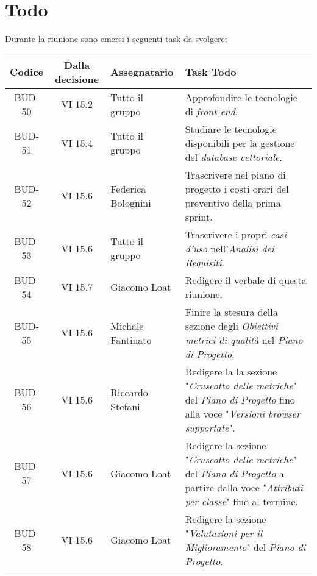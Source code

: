 
\section{Todo}

Durante la riunione sono emersi i seguenti task da svolgere:

\vspace{0.5cm}

\begin{table}[htbp]
\centering
{}
\begin{tabular}{|c|c|p{}|p{}|}
    \hline
    \rowcolor[gray]{0.75}
    \textbf{Codice} & \textbf{Dalla decisione} & \textbf{Assegnatario} & \textbf{Task Todo} \\
    \hline
    BUD-50 & VI 15.2 & Tutto il gruppo & Approfondire le tecnologie di \emph{front-end}. \\
    \hline
    BUD-51 & VI 15.4 & Tutto il gruppo & Studiare le tecnologie disponibili per la gestione del \emph{database vettoriale}. \\
    \hline
    BUD-52 & VI 15.6 & Federica Bolognini & Trascrivere nel piano di progetto i costi orari del preventivo della prima sprint. \\
    \hline
    BUD-53 & VI 15.6 & Tutto il gruppo & Trascrivere i propri \emph{casi d'uso} nell'\emph{Analisi dei Requisiti}. \\
    \hline
    BUD-54 & VI 15.7 & Giacomo Loat & Redigere il verbale di questa riunione. \\
    \hline
    BUD-55 & VI 15.6 & Michale Fantinato & Finire la stesura della sezione degli \emph{Obiettivi metrici di qualità} nel \emph{Piano di Progetto}. \\
    \hline
    BUD-56 & VI 15.6 & Riccardo Stefani & Redigere la la sezione "\emph{Cruscotto delle metriche}" del \emph{Piano di Progetto} fino alla voce "\emph{Versioni browser supportate}". \\
    \hline
    BUD-57 & VI 15.6 & Giacomo Loat & Redigere la sezione "\emph{Cruscotto delle metriche}" del \emph{Piano di Progetto} a partire dalla voce "\emph{Attributi per classe}" fino al termine. \\
    \hline
    BUD-58 & VI 15.6 & Giacomo Loat & Redigere la sezione "\emph{Valutazioni per il Miglioramento}" del \emph{Piano di Progetto}. \\
    \hline
\end{tabular}
\end{table}